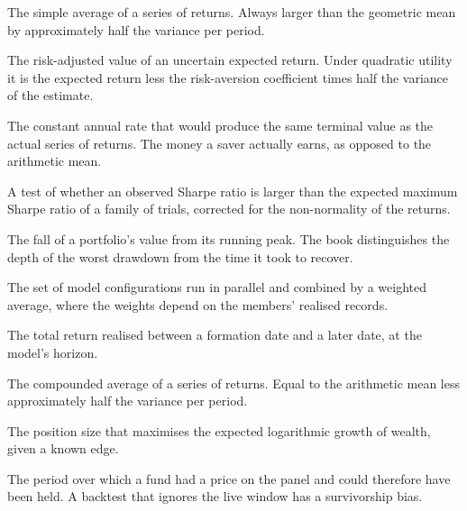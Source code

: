 \begin{description}[style=nextline,leftmargin=1.1em,labelindent=0pt,
  font=\normalfont\ttfamily\color{accent},itemsep=3pt,parsep=0pt]

\item[Arithmetic mean] The simple average of a series of returns. Always
larger than the geometric mean by approximately half the variance per
period.

\item[Certainty equivalent] The risk-adjusted value of an uncertain
expected return. Under quadratic utility it is the expected return less
the risk-aversion coefficient times half the variance of the estimate.

\item[Compound annual growth rate] The constant annual rate that would
produce the same terminal value as the actual series of returns. The
money a saver actually earns, as opposed to the arithmetic mean.

\item[Deflated Sharpe Ratio] A test of whether an observed Sharpe ratio
is larger than the expected maximum Sharpe ratio of a family of trials,
corrected for the non-normality of the returns.

\item[Drawdown] The fall of a portfolio's value from its running peak.
The book distinguishes the depth of the worst drawdown from the time it
took to recover.

\item[Ensemble] The set of model configurations run in parallel and
combined by a weighted average, where the weights depend on the members'
realised records.

\item[Forward return] The total return realised between a formation date
and a later date, at the model's horizon.

\item[Geometric mean] The compounded average of a series of returns. Equal
to the arithmetic mean less approximately half the variance per period.

\item[Kelly criterion] The position size that maximises the expected
logarithmic growth of wealth, given a known edge.

\item[Live window] The period over which a fund had a price on the panel
and could therefore have been held. A backtest that ignores the live
window has a survivorship bias.


\end{description}
